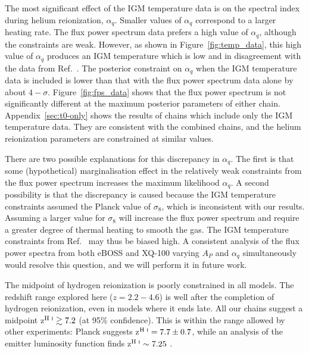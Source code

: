 The most significant effect of the IGM temperature data is on the spectral index during helium reionization, $\alpha_q$.
Smaller values of $\alpha_q$ correspond to a larger heating rate.
The flux power spectrum data prefers a high value of $\alpha_q$, although the constraints are weak.
However, as shown in Figure~\ref{fig:temp_data}, this high value of $\alpha_q$ produces an IGM temperature which is low and in disagreement with the data from Ref.~\cite{2021MNRAS.506.4389G}. The posterior constraint on $\alpha_q$ when the IGM temperature data is included is lower than that with the flux power spectrum data alone by about $4-\sigma$.
Figure~\ref{fig:fps_data} shows that the flux power spectrum is not significantly different at the maximum posterior parameters of either chain.
Appendix~\ref{sec:t0-only} shows the results of chains which include only the IGM temperature data.
They are consistent with the combined chains, and the helium reionization parameters are constrained at similar values.

There are two possible explanations for this discrepancy in $\alpha_q$. The first is that some (hypothetical) marginalisation effect in the relatively weak constraints from the flux power spectrum increases the maximum likelihood $\alpha_q$. A second possibility is that the discrepancy is caused because the IGM temperature constraints assumed the Planck value of $\sigma_8$, which is inconsistent with our results. Assuming a larger value for $\sigma_8$ will increase the flux power spectrum and require a greater degree of thermal heating to smooth the gas. The IGM temperature constraints from Ref.~\cite{2021MNRAS.506.4389G} may thus be biased high. A consistent analysis of the flux power spectra from both eBOSS and XQ-100 varying $A_P$ and $\alpha_q$ simultaneously would resolve this question, and we will perform it in future work.

The midpoint of hydrogen reionization is poorly constrained in all models.
The redshift range explored here ($z=2.2-4.6$) is well after the completion of hydrogen reionization, even in models where it ends late.
All our chains suggest a midpoint z$^{\text{H~{\sc i}}} \gtrsim 7.2$ (at 95\% confidence).
This is within the range allowed by other experiments: Planck suggests z$^{\text{H~{\sc i}}} = 7.7 \pm 0.7$, while an analysis of the \Lya emitter luminosity function finds z$^{\text{H~{\sc i}}} \sim 7.25$ \cite{2021ApJ...919..120M}.

